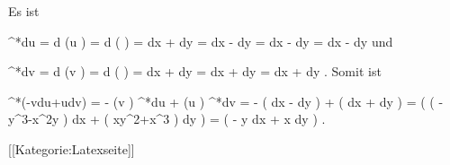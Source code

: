 Es ist

\mavergleichskettealign
{\vergleichskettealign
{ \pi^*du
}
{ =} { d (u \circ \pi)
}
{ =} { d   \left(  {  }  \right)
}
{ =} { {  }   dx + {  } dy
}
{ =} { {  }  dx   - {  }  dy
}
}
{
\vergleichskettefortsetzungalign
{ =} { {  }  dx  - {  }  dy
}
{ =} { {  }  dx  - {  }  dy
}
{ } {}
{ } {}
}
{}{}
und

\mavergleichskettealign
{\vergleichskettealign
{ \pi^*dv
}
{ =} { d (v \circ \pi)
}
{ =} { d \left(  {  }  \right)
}
{ =} { {  } dx + {  } dy
}
{ =} { {  } dx + {  } dy
}
}
{
\vergleichskettefortsetzungalign
{ =} { {  } dx + {  }  dy
}
{ } {
}
{ } {}
{ } {}
}
{}{.}
Somit ist

\mavergleichskettealigndrucklinks
{\vergleichskettealigndrucklinks
{ \pi^*(-vdu+udv)
}
{ =} { - (v \circ \pi)  \pi^*du + (u \circ \pi) \pi^*dv
}
{ =} { - {  } \left(  {  }  dx  - {  }  dy   \right) + {  }  \left(  {  } dx + {  } dy  \right)
}
{ =} { {  }  \left(  \left(  -y^3-x^2y  \right) dx + \left(  xy^2+x^3  \right) dy \right)
}
{ =} { {  }  \left(  -  y dx + x dy \right)
}
}
{}{}{.}

 [[Kategorie:Latexseite]]
